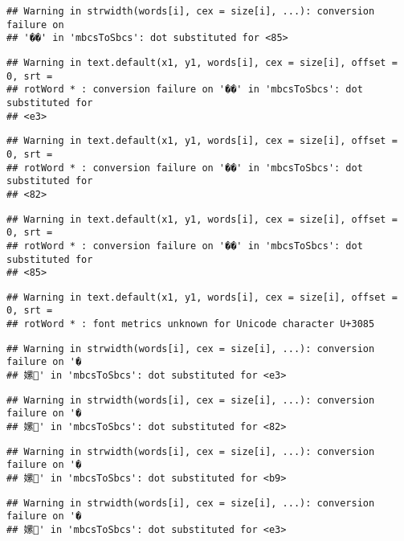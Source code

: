 \documentclass[]{article}
\begin{document}
\begin{verbatim}
## Warning in strwidth(words[i], cex = size[i], ...): conversion failure on
## '��' in 'mbcsToSbcs': dot substituted for <85>
\end{verbatim}

\begin{verbatim}
## Warning in text.default(x1, y1, words[i], cex = size[i], offset = 0, srt =
## rotWord * : conversion failure on '��' in 'mbcsToSbcs': dot substituted for
## <e3>
\end{verbatim}

\begin{verbatim}
## Warning in text.default(x1, y1, words[i], cex = size[i], offset = 0, srt =
## rotWord * : conversion failure on '��' in 'mbcsToSbcs': dot substituted for
## <82>
\end{verbatim}

\begin{verbatim}
## Warning in text.default(x1, y1, words[i], cex = size[i], offset = 0, srt =
## rotWord * : conversion failure on '��' in 'mbcsToSbcs': dot substituted for
## <85>
\end{verbatim}

\begin{verbatim}
## Warning in text.default(x1, y1, words[i], cex = size[i], offset = 0, srt =
## rotWord * : font metrics unknown for Unicode character U+3085
\end{verbatim}

\begin{verbatim}
## Warning in strwidth(words[i], cex = size[i], ...): conversion failure on '�
## 嫘' in 'mbcsToSbcs': dot substituted for <e3>
\end{verbatim}

\begin{verbatim}
## Warning in strwidth(words[i], cex = size[i], ...): conversion failure on '�
## 嫘' in 'mbcsToSbcs': dot substituted for <82>
\end{verbatim}

\begin{verbatim}
## Warning in strwidth(words[i], cex = size[i], ...): conversion failure on '�
## 嫘' in 'mbcsToSbcs': dot substituted for <b9>
\end{verbatim}

\begin{verbatim}
## Warning in strwidth(words[i], cex = size[i], ...): conversion failure on '�
## 嫘' in 'mbcsToSbcs': dot substituted for <e3>
\end{verbatim}
\end{document}
